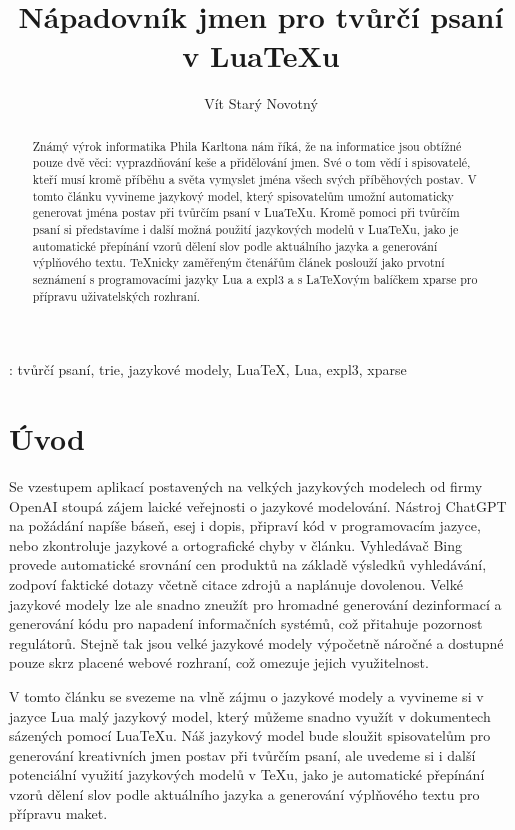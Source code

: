 \documentclass{csbulletin}
\begin{document}

\title{Nápadovník jmen pro tvůrčí psaní v Lua\TeX u}
\author{Vít Starý Novotný}
\maketitle[1ex]

\begin{abstract}
Známý výrok informatika Phila Karltona nám říká, že na informatice jsou obtížné pouze dvě věci: vyprazdňování keše a přidělování jmen. Své o tom vědí i spisovatelé, kteří musí kromě příběhu a světa vymyslet jména všech svých příběhových postav. V tomto článku vyvineme jazykový model, který spisovatelům umožní automaticky generovat jména postav při tvůrčím psaní v Lua\TeX u. Kromě pomoci při tvůrčím psaní si představíme i další možná použití jazykových modelů v Lua\TeX u, jako je automatické přepínání vzorů dělení slov podle aktuálního jazyka a generování výplňového textu. \TeX nicky zaměřeným čtenářům článek poslouží jako prvotní seznámení s programovacími jazyky Lua a expl3 a s \LaTeX ovým balíčkem xparse pro přípravu uživatelských rozhraní.
\end{abstract}
\klicovaslova: tvůrčí psaní, trie, jazykové modely, Lua\TeX, Lua, expl3, xparse

\section*{Úvod}

Se vzestupem aplikací postavených na velkých jazykových modelech od firmy OpenAI stoupá zájem laické veřejnosti o jazykové modelování. Nástroj ChatGPT na požádání napíše báseň, esej i dopis, připraví kód v programovacím jazyce, nebo zkontroluje jazykové a ortografické chyby v článku. Vyhledávač Bing provede automatické srovnání cen produktů na základě výsledků vyhledávání, zodpoví faktické dotazy včetně citace zdrojů a naplánuje dovolenou. Velké jazykové modely lze ale snadno zneužít pro hromadné generování dezinformací a generování kódu pro napadení informačních systémů, což přitahuje pozornost regulátorů. Stejně tak jsou velké jazykové modely výpočetně náročné a dostupné pouze skrz placené webové rozhraní, což omezuje jejich využitelnost.

V tomto článku se svezeme na vlně zájmu o jazykové modely a vyvineme si v jazyce Lua malý jazykový model, který můžeme snadno využít v dokumentech sázených pomocí Lua\TeX u. Náš jazykový model bude sloužit spisovatelům pro generování kreativních jmen postav při tvůrčím psaní, ale uvedeme si i další potenciální využití jazykových modelů v \TeX u, jako je automatické přepínání vzorů dělení slov podle aktuálního jazyka a generování výplňového textu pro přípravu maket.
\end{document}
